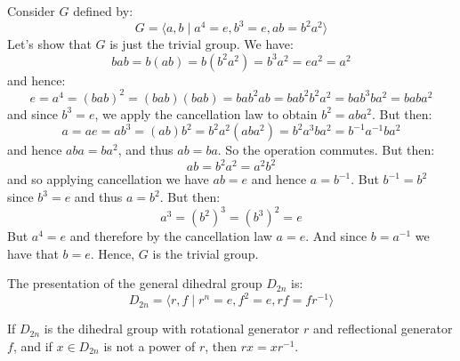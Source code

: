     \begin{example}
        Consider $G$ defined by:
        \begin{equation}
            G=\langle{a,b}\;|\;a^{4}=e,b^{3}=e,ab=b^{2}a^{2}\rangle
        \end{equation}
        Let's show that $G$ is just the trivial group. We have:
        \begin{equation}
            bab=b(ab)=b(b^{2}a^{2})=b^{3}a^{2}=ea^{2}=a^{2}
        \end{equation}
        and hence:
        \begin{equation}
            e=a^{4}=(bab)^{2}=(bab)(bab)=bab^{2}ab=
            bab^{2}b^{2}a^{2}=bab^{3}ba^{2}=baba^{2}
        \end{equation}
        and since $b^{3}=e$, we apply the cancellation law to obtain
        $b^{2}=aba^{2}$. But then:
        \begin{equation}
            a=ae=ab^{3}=(ab)b^{2}=b^{2}a^{2}(aba^{2})
            =b^{2}a^{3}ba^{2}=b^{\minus{1}}a^{\minus{1}}ba^{2}
        \end{equation}
        and hence $aba=ba^{2}$, and thus $ab=ba$. So the operation
        commutes. But then:
        \begin{equation}
            ab=b^{2}a^{2}=a^{2}b^{2}
        \end{equation}
        and so applying cancellation we have $ab=e$ and hence
        $a=b^{\minus{1}}$. But $b^{\minus{1}}=b^{2}$ since $b^{3}=e$
        and thus $a=b^{2}$. But then:
        \begin{equation}
            a^{3}=(b^{2})^{3}=(b^{3})^{2}=e
        \end{equation}
        But $a^{4}=e$ and therefore by the cancellation law $a=e$.
        And since $b=a^{\minus{1}}$ we have that $b=e$. Hence, $G$ is
        the trivial group.
    \end{example}
    The presentation of the general dihedral group $D_{2n}$ is:
    \begin{equation}
        D_{2n}=\langle{r,f}\;|\;r^{n}=e,f^{2}=e,rf=fr^{\minus{1}}\rangle
    \end{equation}
    \begin{theorem}
        If $D_{2n}$ is the dihedral group with rotational generator $r$
        and reflectional generator $f$, and if $x\in{D}_{2n}$ is not a
        power of $r$, then $rx=xr^{\minus{1}}$.
    \end{theorem}

